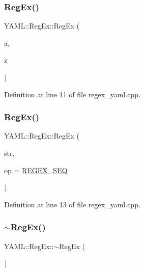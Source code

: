 \subsubsection{\texorpdfstring{RegEx()}{RegEx()}\hspace{0.1cm}{\footnotesize\ttfamily [3/4]}}
{\footnotesize\ttfamily Y\+A\+M\+L\+::\+Reg\+Ex\+::\+Reg\+Ex (\begin{DoxyParamCaption}\item[{char}]{a,  }\item[{char}]{z }\end{DoxyParamCaption})}



Definition at line 11 of file regex\+\_\+yaml.\+cpp.

\mbox{\label{class_y_a_m_l_1_1_reg_ex_a9a158130aef316729dc5f35d99168590}} 
\subsubsection{\texorpdfstring{RegEx()}{RegEx()}\hspace{0.1cm}{\footnotesize\ttfamily [4/4]}}
{\footnotesize\ttfamily Y\+A\+M\+L\+::\+Reg\+Ex\+::\+Reg\+Ex (\begin{DoxyParamCaption}\item[{const \mbox{\hyperlink{glad_8h_ac83513893df92266f79a515488701770}{std\+::string}} \&}]{str,  }\item[{\mbox{\hyperlink{namespace_y_a_m_l_a7bdf8e8bf393f2547c682451e088023c}{R\+E\+G\+E\+X\+\_\+\+OP}}}]{op = {\ttfamily \mbox{\hyperlink{namespace_y_a_m_l_a7bdf8e8bf393f2547c682451e088023ca1b4d004e2e170a51eaa327480acd5761}{R\+E\+G\+E\+X\+\_\+\+S\+EQ}}} }\end{DoxyParamCaption})}



Definition at line 13 of file regex\+\_\+yaml.\+cpp.

\mbox{\label{class_y_a_m_l_1_1_reg_ex_afd63983e69e470e2399d9b92fa84a070}} 
\subsubsection{\texorpdfstring{$\sim$RegEx()}{~RegEx()}}
{\footnotesize\ttfamily Y\+A\+M\+L\+::\+Reg\+Ex\+::$\sim$\+Reg\+Ex (\begin{DoxyParamCaption}{ }\end{DoxyParamCaption})\hspace{0.3cm}{\ttfamily [inline]}}



